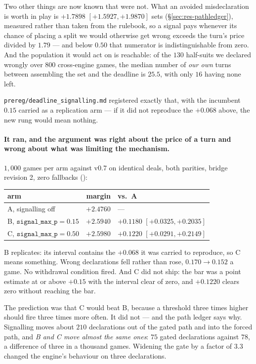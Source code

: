 \documentclass[11pt,a4paper]{article}
\begin{document}
Two other things are now known that were not. What an avoided misdeclaration
is worth in play is $+1.7898$ $[+1.5927, +1.9870]$ sets
(\S\ref{sec:res-pathledger}), measured rather than taken from the rulebook, so
a signal pays whenever its chance of placing a split we would otherwise get
wrong exceeds the turn's price divided by $1.79$ --- and below $0.50$ that
numerator is indistinguishable from zero. And the population it would act on
is reachable: of the $130$ half-suits we declared wrongly over $800$
cross-engine games, the median number of \emph{our own} turns between
assembling the set and the deadline is $25.5$, with only $16$ having none
left.

\texttt{prereg/deadline\_signalling.md} registered exactly that, with the
incumbent $0.15$ carried as a replication arm --- if it did not reproduce the
$+0.068$ above, the new rung would mean nothing.

\paragraph{It ran, and the argument was right about the price of a turn and
wrong about what was limiting the mechanism.} $1{,}000$ games per arm against
v0.7 on identical deals, both parities, bridge revision 2, zero fallbacks
():

\begin{center}
\small
\begin{tabular}{lrl}
\toprule
arm & margin & vs.\ A \\
\midrule
A, signalling off & $+2.4760$ & --- \\
B, $\texttt{signal\_max\_p} = 0.15$ & $+2.5940$ & $+0.1180$ $[+0.0325, +0.2035]$ \\
C, $\texttt{signal\_max\_p} = 0.50$ & $+2.5980$ & $+0.1220$ $[+0.0291, +0.2149]$ \\
\bottomrule
\end{tabular}
\end{center}

B replicates: its interval contains the $+0.068$ it was carried to reproduce,
so C means something. Wrong declarations fell rather than rose, $0.170 \to
0.152$ a game. No withdrawal condition fired. And C did not ship: the bar was a
point estimate at or above $+0.15$ with the interval clear of zero, and
$+0.1220$ clears zero without reaching the bar.

The prediction was that C would beat B, because a threshold three times higher
should fire three times more often. It did not --- and the path ledger says
why. Signalling moves about $210$ declarations out of the gated path and into
the forced path, and \emph{B and C move almost the same ones}: $75$ gated
declarations against $78$, a difference of three in a thousand games. Widening
the gate by a factor of $3.3$ changed the engine's behaviour on three
declarations.
\end{document}
